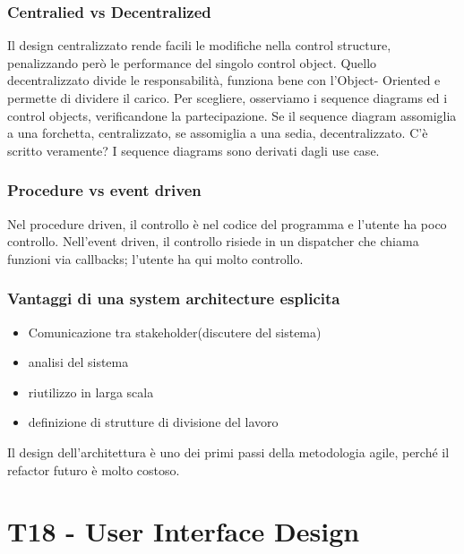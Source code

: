 \documentclass{article}
\begin{document}
\subsubsection{Centralied vs Decentralized}
Il design centralizzato rende facili le modifiche nella control structure, penalizzando però le performance
del singolo control object. Quello decentralizzato divide le responsabilità, funziona bene con l'Object-
Oriented e permette di dividere il carico. Per scegliere, osserviamo i sequence diagrams ed i control
objects, verificandone la partecipazione. Se il sequence diagram assomiglia a una forchetta, centralizzato,
se assomiglia a una sedia, decentralizzato. C'è scritto veramente? I sequence diagrams sono derivati dagli
use case.



\subsubsection{Procedure vs event driven}
Nel procedure driven, il controllo è nel codice del programma e l'utente ha poco controllo. Nell'event driven,
il controllo risiede in un dispatcher che chiama funzioni via callbacks; l'utente ha qui molto controllo.

\subsubsection{Vantaggi di una system architecture esplicita}
\begin{itemize}
    \item Comunicazione tra stakeholder(discutere del sistema)
    \item analisi del sistema
    \item riutilizzo in larga scala
    \item definizione di strutture di divisione del lavoro
\end{itemize}

Il design dell'architettura è uno dei primi passi della metodologia agile, perché il refactor futuro è molto
costoso.


\section{T18 - User Interface Design}
\end{document}
